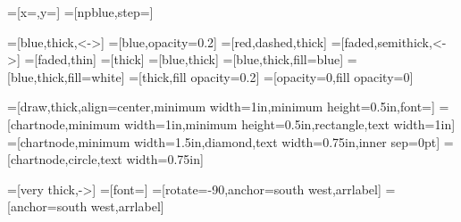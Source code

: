 \usepackage{tikz}
\usetikzlibrary{backgrounds}
\usetikzlibrary{arrows}
\usetikzlibrary{intersections}
\usetikzlibrary{calc}
\usetikzlibrary{shapes.geometric}




=[x=\linespace,y=\linespace]
=[npblue,step=\linespace]

=[blue,thick,<->]
=[blue,opacity=0.2]
=[red,dashed,thick]
=[faded,semithick,<->]
=[faded,thin]
=[thick]
=[blue,thick]
=[blue,thick,fill=blue]
=[blue,thick,fill=white]
=[thick,fill opacity=0.2]
=[opacity=0,fill opacity=0]

=[draw,thick,align=center,minimum width=1in,minimum height=0.5in,font=\footnotesize]
=[chartnode,minimum width=1in,minimum height=0.5in,rectangle,text width=1in]
=[chartnode,minimum width=1.5in,diamond,text width=0.75in,inner sep=0pt]
=[chartnode,circle,text width=0.75in]

=[very thick,->]
=[font=\scriptsize]
=[rotate=-90,anchor=south west,arrlabel]
=[anchor=south west,arrlabel]
